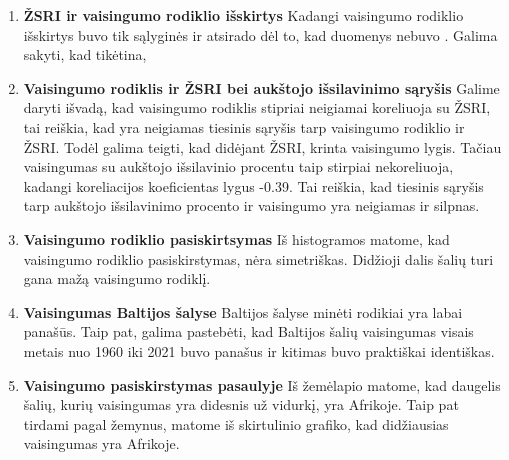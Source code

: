 \begin{enumerate}
    \item \textbf{ŽSRI ir vaisingumo rodiklio išskirtys}
    Kadangi vaisingumo rodiklio išskirtys buvo tik sąlyginės ir atsirado dėl to, kad duomenys nebuvo . Galima sakyti, kad tikėtina, 

    \item \textbf{Vaisingumo rodiklis ir ŽSRI bei aukštojo išsilavinimo sąryšis}
    Galime daryti išvadą, kad vaisingumo rodiklis stipriai neigiamai koreliuoja su ŽSRI, tai reiškia, kad yra neigiamas tiesinis sąryšis tarp vaisingumo rodiklio ir ŽSRI. Todėl galima teigti, kad didėjant ŽSRI, krinta vaisingumo lygis.
    Tačiau vaisingumas su aukštojo išsilavinio procentu taip stirpiai nekoreliuoja, kadangi koreliacijos koeficientas lygus -0.39. Tai reiškia, kad tiesinis sąryšis tarp aukštojo išsilavinimo procento ir vaisingumo yra neigiamas ir silpnas.

    \item \textbf{Vaisingumo rodiklio pasiskirtsymas}
    Iš histogramos matome, kad vaisingumo rodiklio pasiskirstymas, nėra simetriškas. Didžioji dalis šalių turi gana mažą vaisingumo rodiklį. 

    \item \textbf{Vaisingumas Baltijos šalyse}
    Baltijos šalyse minėti rodikiai yra labai panašūs. Taip pat, galima pastebėti, kad Baltijos šalių vaisingumas visais metais nuo 1960 iki 2021 buvo panašus ir kitimas buvo praktiškai identiškas.

    \item \textbf{Vaisingumo pasiskirstymas pasaulyje}
    Iš žemėlapio matome, kad daugelis šalių, kurių vaisingumas yra didesnis už vidurkį, yra Afrikoje.
    Taip pat tirdami pagal žemynus, matome iš skirtulinio grafiko, kad didžiausias vaisingumas yra Afrikoje.
\end{enumerate}